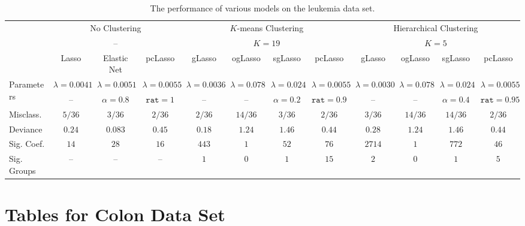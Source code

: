 \documentclass[10pt]{article}
\begin{document}
\begin{landscape}
\begin{table}[ht]
    \vspace{0.45cm} %
   \begin{tabularx}{0.991\linewidth}{lccccccccccc} \toprule
         & \multicolumn{3}{c}{No Clustering} & \multicolumn{4}{c}{$K$-means Clustering} & \multicolumn{4}{c}{Hierarchical Clustering} \\ 
         & \multicolumn{3}{c}{--} & \multicolumn{4}{c}{$K=19$} & \multicolumn{4}{c}{$K=5$} \\   
         \cmidrule(r){2-4} \cmidrule(lr){5-8} \cmidrule(l){9-12}
         & Lasso & Elastic Net & pcLasso & gLasso & ogLasso & sgLasso & pcLasso & gLasso & ogLasso & sgLasso & pcLasso \\ \midrule
        \multirow{2}{*}{Parameters} & $\lambda = 0.0041$ & $\lambda = 0.0051$ & $\lambda = 0.0055$ & $\lambda = 0.0036$ & $\lambda = 0.078$ & $\lambda = 0.024$ & $\lambda = 0.0055$ & $\lambda = 0.0030$ & $\lambda = 0.078$ & $\lambda = 0.024$ & $\lambda = 0.0055$ \\ 
         & -- & $\alpha = 0.8$ & $\texttt{rat} = 1$ & -- & -- & $\alpha = 0.2$ & $\texttt{rat} = 0.9$ & -- & -- & $\alpha = 0.4$ & $\texttt{rat} = 0.95$ \\ %
        Misclass. & $5/36$ & $3/36$ & $2/36$ & $2/36$ & $14/36$ & $3/36$ & $2/36$ & $3/36$ & $14/36$ & $14/36$ & $2/36$ \\
        Deviance & $0.24$ & $0.083$ & $0.45$ & $0.18$ & $1.24$ & $1.46$ & $0.44$ & $0.28$ & $1.24$ & $1.46$ & $0.44$ \\
        Sig. Coef. & $14$ & $28$ & $16$ & $443$ & $1$ & $52$ & $76$ & $2714$ & $1$ & $772$ & $46$ \\
        Sig. Groups & -- & -- & -- & $1$ & $0$ & $1$ & $15$ & $2$ & $0$ & $1$ & $5$ \\ \bottomrule
    \end{tabularx}
    \caption{The performance of various models on the leukemia data set.}
    \label{leuktablenew}
    
\end{table}

\end{landscape}

\newpage

\section{Tables for Colon Data Set}

\end{document}
